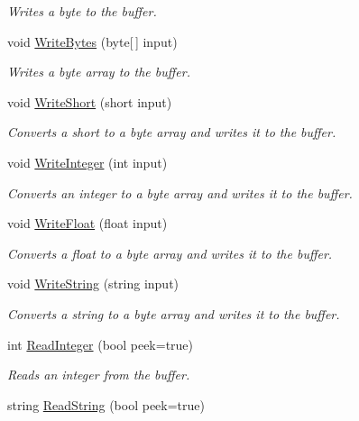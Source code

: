 \begin{DoxyCompactItemize}
\begin{DoxyCompactList}\small\item\em Writes a byte to the buffer. \end{DoxyCompactList}\item 
void \mbox{\hyperlink{class_byte_buffer_abbb2d979bae5a3d06df65de86979aa75}{Write\+Bytes}} (byte\mbox{[}$\,$\mbox{]} input)
\begin{DoxyCompactList}\small\item\em Writes a byte array to the buffer. \end{DoxyCompactList}\item 
void \mbox{\hyperlink{class_byte_buffer_a1b3f0df4368105492833d48b8c35b7e6}{Write\+Short}} (short input)
\begin{DoxyCompactList}\small\item\em Converts a short to a byte array and writes it to the buffer. \end{DoxyCompactList}\item 
void \mbox{\hyperlink{class_byte_buffer_a9343c632b31720770d4ea3bcabaac296}{Write\+Integer}} (int input)
\begin{DoxyCompactList}\small\item\em Converts an integer to a byte array and writes it to the buffer. \end{DoxyCompactList}\item 
void \mbox{\hyperlink{class_byte_buffer_a256bb398a33dc7469c3b2c498414b61d}{Write\+Float}} (float input)
\begin{DoxyCompactList}\small\item\em Converts a float to a byte array and writes it to the buffer. \end{DoxyCompactList}\item 
void \mbox{\hyperlink{class_byte_buffer_a0f46a523deadb0d47ad0bd5bd9ab58ba}{Write\+String}} (string input)
\begin{DoxyCompactList}\small\item\em Converts a string to a byte array and writes it to the buffer. \end{DoxyCompactList}\item 
int \mbox{\hyperlink{class_byte_buffer_a31b45da0084d7c7917292b151f01b69a}{Read\+Integer}} (bool peek=true)
\begin{DoxyCompactList}\small\item\em Reads an integer from the buffer. \end{DoxyCompactList}\item 
string \mbox{\hyperlink{class_byte_buffer_a2dc74466e4ca3e68bdcb7b4fdc8c0f3a}{Read\+String}} (bool peek=true)

\end{DoxyCompactItemize}
